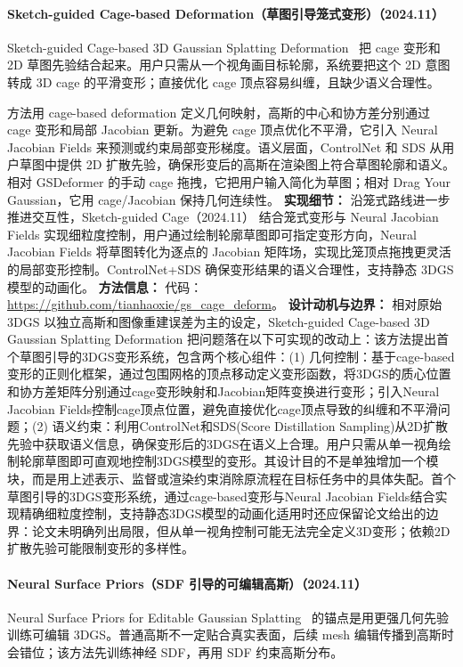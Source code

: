 \paragraph{Sketch-guided Cage-based Deformation（草图引导笼式变形）（2024.11）}
Sketch-guided Cage-based 3D Gaussian Splatting Deformation~\cite{2411_12168} 把 cage 变形和 2D 草图先验结合起来。用户只需从一个视角画目标轮廓，系统要把这个 2D 意图转成 3D cage 的平滑变形；直接优化 cage 顶点容易纠缠，且缺少语义合理性。

方法用 cage-based deformation 定义几何映射，高斯的中心和协方差分别通过 cage 变形和局部 Jacobian 更新。为避免 cage 顶点优化不平滑，它引入 Neural Jacobian Fields 来预测或约束局部变形梯度。语义层面，ControlNet 和 SDS 从用户草图中提供 2D 扩散先验，确保形变后的高斯在渲染图上符合草图轮廓和语义。相对 GSDeformer 的手动 cage 拖拽，它把用户输入简化为草图；相对 Drag Your Gaussian，它用 cage/Jacobian 保持几何连续性。
\textbf{实现细节：} 沿笼式路线进一步推进交互性，Sketch-guided Cage（2024.11） 结合笼式变形与 Neural Jacobian Fields 实现细粒度控制，用户通过绘制轮廓草图即可指定变形方向，Neural Jacobian Fields 将草图转化为逐点的 Jacobian 矩阵场，实现比笼顶点拖拽更灵活的局部变形控制。ControlNet+SDS 确保变形结果的语义合理性，支持静态 3DGS 模型的动画化。
\textbf{方法信息：} 代码：\url{https://github.com/tianhaoxie/gs_cage_deform}。
\textbf{设计动机与边界：} 相对原始 3DGS 以独立高斯和图像重建误差为主的设定，Sketch-guided Cage-based 3D Gaussian Splatting Deformation 把问题落在以下可实现的改动上：该方法提出首个草图引导的3DGS变形系统，包含两个核心组件：(1) 几何控制：基于cage-based变形的正则化框架，通过包围网格的顶点移动定义变形函数，将3DGS的质心位置和协方差矩阵分别通过cage变形映射和Jacobian矩阵变换进行变形；引入Neural Jacobian Fields控制cage顶点位置，避免直接优化cage顶点导致的纠缠和不平滑问题；(2) 语义约束：利用ControlNet和SDS(Score Distillation Sampling)从2D扩散先验中获取语义信息，确保变形后的3DGS在语义上合理。用户只需从单一视角绘制轮廓草图即可直观地控制3DGS模型的变形。其设计目的不是单独增加一个模块，而是用上述表示、监督或渲染约束消除原流程在目标任务中的具体失配。首个草图引导的3DGS变形系统，通过cage-based变形与Neural Jacobian Fields结合实现精确细粒度控制，支持静态3DGS模型的动画化适用时还应保留论文给出的边界：论文未明确列出局限，但从单一视角控制可能无法完全定义3D变形；依赖2D扩散先验可能限制变形的多样性。
\paragraph{Neural Surface Priors（SDF 引导的可编辑高斯）（2024.11）}
Neural Surface Priors for Editable Gaussian Splatting~\cite{2411_18311} 的锚点是用更强几何先验训练可编辑 3DGS。普通高斯不一定贴合真实表面，后续 mesh 编辑传播到高斯时会错位；该方法先训练神经 SDF，再用 SDF 约束高斯分布。

